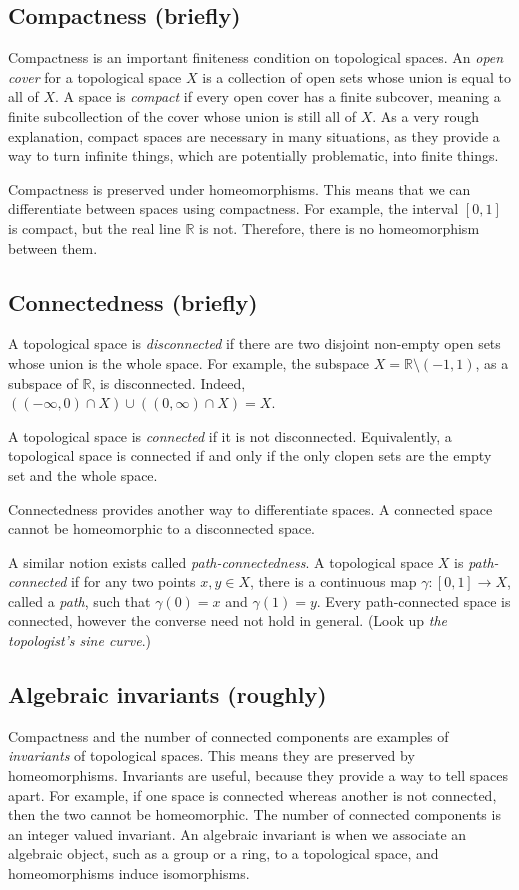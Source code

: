 \documentclass[a4paper,11pt]{article}
\begin{document}
    \subsection{Compactness (briefly)}
    Compactness is an important finiteness condition on topological spaces. An \emph{open cover} for a topological space \(X\) is a collection of open sets whose union is equal to all of \(X\). A space is \emph{compact} if every open cover has a finite subcover, meaning a finite subcollection of the cover whose union is still all of \(X\). As a very rough explanation, compact spaces are necessary in many situations, as they provide a way to turn infinite things, which are potentially problematic, into finite things.

    Compactness is preserved under homeomorphisms. This means that we can differentiate between spaces using compactness. For example, the interval \([0,1]\) is compact, but the real line \(\mathbb{R}\) is not. Therefore, there is no homeomorphism between them.

    \subsection{Connectedness (briefly)}
    A topological space is \emph{disconnected} if there are two disjoint non-empty open sets whose union is the whole space. For example, the subspace \(X = \mathbb{R} \setminus (-1, 1)\), as a subspace of \(\mathbb{R}\), is disconnected. Indeed, \(((-\infty, 0) \cap X) \cup ((0, \infty) \cap X) = X\).

    A topological space is \emph{connected} if it is not disconnected. Equivalently, a topological space is connected if and only if the only clopen sets are the empty set and the whole space.

    Connectedness provides another way to differentiate spaces. A connected space cannot be homeomorphic to a disconnected space.

    A similar notion exists called \textit{path-connectedness}. A topological space \(X\) is \emph{path-connected} if for any two points \(x,y \in X\), there is a continuous map \(\gamma: [0,1] \to X\), called a \emph{path}, such that \(\gamma(0) = x\) and \(\gamma(1) = y\). Every path-connected space is connected, however the converse need not hold in general. (Look up \textit{the topologist's sine curve}.)

    \subsection{Algebraic invariants (roughly)}
      Compactness and the number of connected components are examples of \textit{invariants} of topological spaces. This means they are preserved by homeomorphisms. Invariants are useful, because they provide a way to tell spaces apart. For example, if one space is connected whereas another is not connected, then the two cannot be homeomorphic. The number of connected components is an integer valued invariant. An algebraic invariant is when we associate an algebraic object, such as a group or a ring, to a topological space, and homeomorphisms induce isomorphisms.
\end{document}
